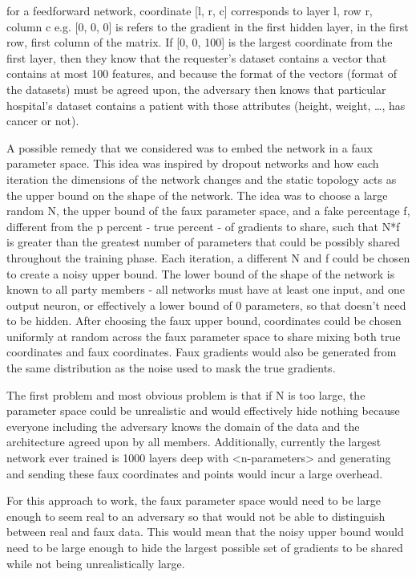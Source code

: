 for a feedforward network, coordinate [l, r, c] corresponds to layer l, row r, column c e.g. [0, 0, 0] is refers to the gradient in the first hidden layer, in the first row, first column of the matrix. If [0, 0, 100] is the largest coordinate from the first layer, then they know that the requester’s dataset contains a vector that contains at most 100 features, and because the format of the vectors (format of the datasets) must be agreed upon, the adversary then knows that particular hospital’s dataset contains a patient with those attributes (height, weight, …, has cancer or not).

A possible remedy that we considered was to embed the network in a faux parameter space. This idea was inspired by dropout networks and how each iteration the dimensions of the network changes and the static topology acts as the upper bound on the shape of the network. The idea was to choose a large random N, the upper bound of the faux parameter space, and a fake percentage f, different from the p percent - true percent - of gradients to share, such that N*f is greater than the greatest number of parameters that could be possibly shared throughout the training phase. Each iteration, a different N and f could be chosen to create a noisy upper bound. The lower bound of the shape of the network is known to all party members - all networks must have at least one input, and one output neuron, or effectively a lower bound of 0 parameters, so that doesn’t need to be hidden. After choosing the faux upper bound, coordinates could be chosen uniformly at random across the faux parameter space to share mixing both true coordinates and faux coordinates. Faux gradients would also be generated from the same distribution as the noise used to mask the true gradients.

The first problem and most obvious problem is that if N is too large, the parameter space could be unrealistic and would effectively hide nothing because everyone including the adversary knows the domain of the data and the architecture agreed upon by all members. Additionally, currently the largest network ever trained is 1000 layers deep with <n-parameters> and generating and sending these faux coordinates and points would incur a large overhead. 

For this approach to work, the faux parameter space would need to be large enough to seem real to an adversary so that would not be able to distinguish between real and faux data. This would mean that the noisy upper bound would need to be large enough to hide the largest possible set of gradients to be shared while not being unrealistically large.

